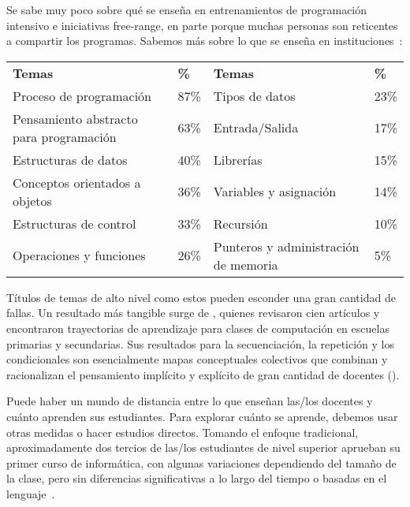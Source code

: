 
Se sabe muy poco sobre qué se enseña en entrenamientos de programación intensivo e iniciativas free-range, en parte porque muchas personas son reticentes a compartir los programas.
Sabemos más sobre lo que  se enseña en instituciones~\cite{Luxt2017}:

\begin{longtable}{llll}
\textbf{Temas}            & \textbf{\%}    & \textbf{Temas}        & \textbf{\%} \\
Proceso de programación         & 87\%        & Tipos de datos                & 23\% \\
Pensamiento abstracto para programación    & 63\%        & Entrada/Salida                  & 17\% \\
Estructuras de datos              & 40\%        & Librerías                     & 15\% \\
Conceptos orientados a objetos        & 36\%        & Variables y asignación       & 14\% \\
Estructuras de control              & 33\%        & Recursión             & 10\% \\
Operaciones y funciones         & 26\%        & Punteros y administración de memoria    &  5\%
\end{longtable}

Títulos de temas de alto nivel como estos pueden esconder una gran cantidad de fallas.
Un resultado más tangible surge de \cite{Rich2017},
quienes revisaron cien artículos y encontraron trayectorias de aprendizaje para clases de computación en escuelas primarias y secundarias.
Sus resultados para la secuenciación, la repetición y los condicionales son esencialmente mapas conceptuales colectivos
que combinan y racionalizan el pensamiento implícito y explícito de gran cantidad de docentes
().

\newpage



Puede haber un mundo de distancia entre lo que enseñan las/los docentes y cuánto aprenden sus estudiantes.
Para explorar cuánto se aprende, debemos usar otras medidas o hacer estudios directos.
Tomando el enfoque tradicional, aproximadamente dos tercios de las/los estudiantes de nivel superior aprueban su primer curso de informática,
con algunas variaciones dependiendo del tamaño de la clase,
pero sin diferencias significativas a lo largo del tiempo o basadas en el lenguaje~\cite{Benn2007a,Wats2014}.

